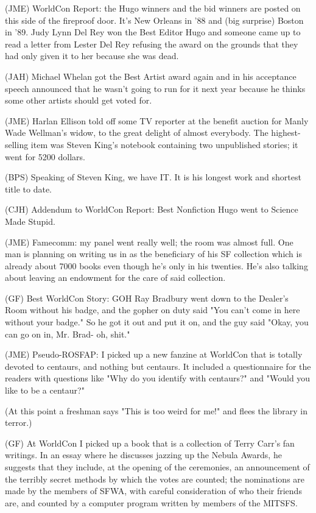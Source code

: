 \documentclass[12pt]{article}
\begin{document}
(JME) WorldCon Report: the Hugo winners and the bid winners are posted on this side of the fireproof door. It's New Orleans in '88 and (big surprise) Boston in '89. Judy Lynn Del Rey won the Best Editor Hugo and someone came up to read a letter from Lester Del Rey refusing the award on the grounds that they had only given it to her because she was dead.

(JAH) Michael Whelan got the Best Artist award again and in his acceptance speech announced that he wasn't going to run for it next year because he thinks some other artists should get voted for.

(JME) Harlan Ellison told off some TV reporter at the benefit auction for Manly Wade Wellman's widow, to the great delight of almost everybody. The highest-selling item was Steven King's notebook containing two unpublished stories; it went for 5200 dollars.

(BPS) Speaking of Steven King, we have IT. It is his longest work and shortest title to date.

(CJH) Addendum to WorldCon Report: Best Nonfiction Hugo went to Science Made Stupid.

(JME) Famecomm: my panel went really well; the room was almost full. One man is planning on writing us in as the beneficiary of his SF collection which is already about 7000 books even though he's only in his twenties. He's also talking about leaving an endowment for the care of said collection.

(GF) Best WorldCon Story: GOH Ray Bradbury went down to the Dealer's Room without his badge, and the gopher on duty said "You can't come in here without your badge." So he got it out and put it on, and the guy said "Okay, you can go on in, Mr. Brad- oh, shit."

(JME) Pseudo-ROSFAP: I picked up a new fanzine at WorldCon that is totally devoted to centaurs, and nothing but centaurs. It included a questionnaire for the readers with questions like "Why do you identify with centaurs?" and "Would you like to be a centaur?"

(At this point a freshman says "This is too weird for me!" and flees the library in terror.)

(GF) At WorldCon I picked up a book that is a collection of Terry Carr's fan writings. In an essay where he discusses jazzing up the Nebula Awards, he suggests that they include, at the opening of the ceremonies, an announcement of the terribly secret methods by which the votes are counted; the nominations are made by the members of SFWA, with careful consideration of who their friends are, and counted by a computer program written by members of the MITSFS.
\end{document}
